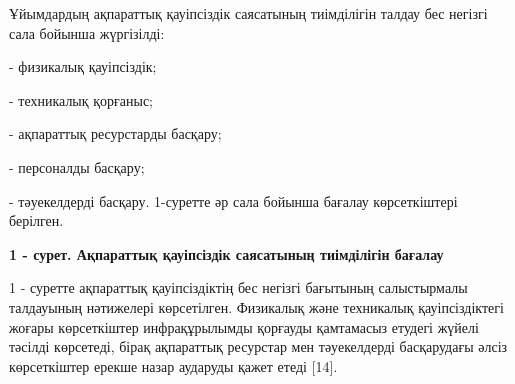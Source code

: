 \begin{multicols}{2}
Ұйымдардың ақпараттық қауіпсіздік саясатының тиімділігін талдау бес
негізгі сала бойынша жүргізілді:

- физикалық қауіпсіздік;

- техникалық қорғаныс;

- ақпараттық ресурстарды басқару;

- персоналды басқару;

- тәуекелдерді басқару.
1-суретте әр сала бойынша бағалау көрсеткіштері берілген.
\end{multicols}

{\bfseries 1 - сурет. Ақпараттық қауіпсіздік саясатының тиімділігін бағалау}

1 - суретте ақпараттық қауіпсіздіктің бес негізгі бағытының салыстырмалы
талдауының нәтижелері көрсетілген. Физикалық және техникалық
қауіпсіздіктегі жоғары көрсеткіштер инфрақұрылымды қорғауды қамтамасыз
етудегі жүйелі тәсілді көрсетеді, бірақ ақпараттық ресурстар мен
тәуекелдерді басқарудағы әлсіз көрсеткіштер ерекше назар аударуды қажет
етеді {[}14{]}.

